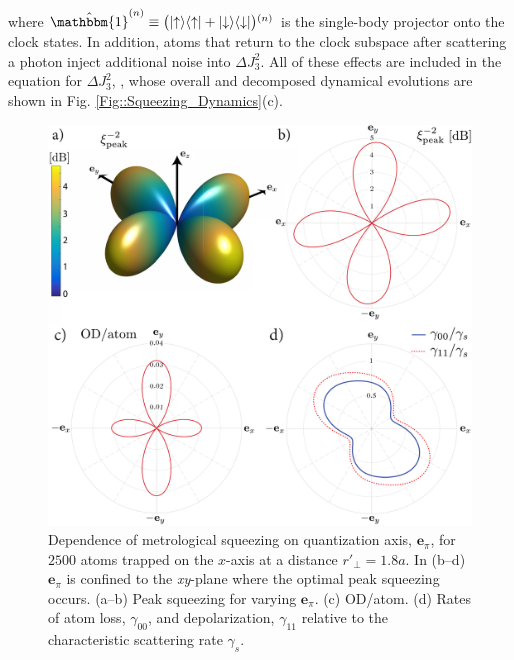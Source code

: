 \documentclass[preprint, aps,pra,onecolumn]{revtex4-1} %
\newcommand{\varz}{\Delta J_3^2}
\newcommand{\qaxis}{\mathbf{e}_\pi}
\begin{document}
where $\hat{\mathbbm{1}}^{(n)} \equiv \big( \op{\uparrow}{\uparrow} + \op{\downarrow}{\downarrow} \big){}^{(n)}$ is the single-body projector onto the clock states. 
In addition, atoms that return to the clock subspace after scattering a photon inject additional noise into $\varz$.  
All of these effects are included in the equation for $\varz$, , whose overall and decomposed dynamical evolutions are shown in Fig. \ref{Fig::Squeezing_Dynamics}(c). 


\begin{figure}
\includegraphics[scale=0.37]{./Figs/Fig_SqueezingQuantAxis}
\caption{Dependence of metrological squeezing on quantization axis, $\qaxis$, for $2500$ atoms trapped on the $x$-axis at a distance $ r'\!_\perp=1.8a$. In (b--d) $\qaxis$ is confined to the \emph{xy}-plane where the optimal peak squeezing occurs.
(a--b) Peak squeezing for varying $\qaxis$. 
(c) OD/atom.
(d) Rates of atom loss, $\gamma_{00}$, and depolarization, $\gamma_{11}$ relative to the characteristic scattering rate $\gamma_s$. }\label{Fig::Squeezing_QuantizationAxis}
\end{figure}
\end{document}

